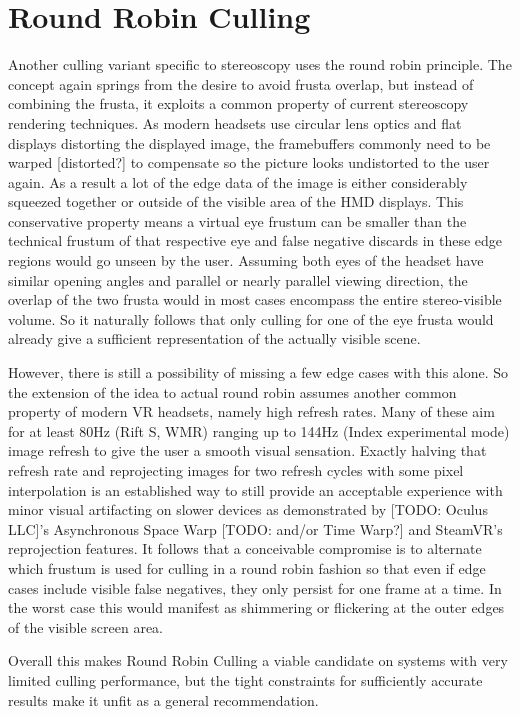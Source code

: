 \section{Round Robin Culling}
Another culling variant specific to stereoscopy uses the round robin principle. The concept again springs from the desire to avoid frusta overlap, but instead of combining the frusta, it exploits a common property of current stereoscopy rendering techniques. As modern headsets use circular lens optics and flat displays distorting the displayed image, the framebuffers commonly need to be warped [distorted?] to compensate so the picture looks undistorted to the user again. As a result a lot of the edge data of the image is either considerably squeezed together or outside of the visible area of the HMD displays.
This conservative property means a virtual eye frustum can be smaller than the technical frustum of that respective eye and false negative discards in these edge regions would go unseen by the user.
Assuming both eyes of the headset have similar opening angles and parallel or nearly parallel viewing direction, the overlap of the two frusta would in most cases encompass the entire stereo-visible volume. So it naturally follows that only culling for one of the eye frusta would already give a sufficient representation of the actually visible scene.

However, there is still a possibility of missing a few edge cases with this alone. So the extension of the idea to actual round robin assumes another common property of modern VR headsets, namely high refresh rates. Many of these aim for at least 80Hz (Rift S, WMR) ranging up to 144Hz (Index experimental mode) image refresh to give the user a smooth visual sensation.
Exactly halving that refresh rate and reprojecting images for two refresh cycles with some pixel interpolation is an established way to still provide an acceptable experience with minor visual artifacting on slower devices as demonstrated by [TODO: Oculus LLC]'s Asynchronous Space Warp [TODO: and/or Time Warp?] and SteamVR's reprojection features. It follows that a conceivable compromise is to alternate which frustum is used for culling in a round robin fashion so that even if edge cases include visible false negatives, they only persist for one frame at a time. In the worst case this would manifest as shimmering or flickering at the outer edges of the visible screen area.

Overall this makes Round Robin Culling a viable candidate on systems with very limited culling performance, but the tight constraints for sufficiently accurate results make it unfit as a general recommendation.

